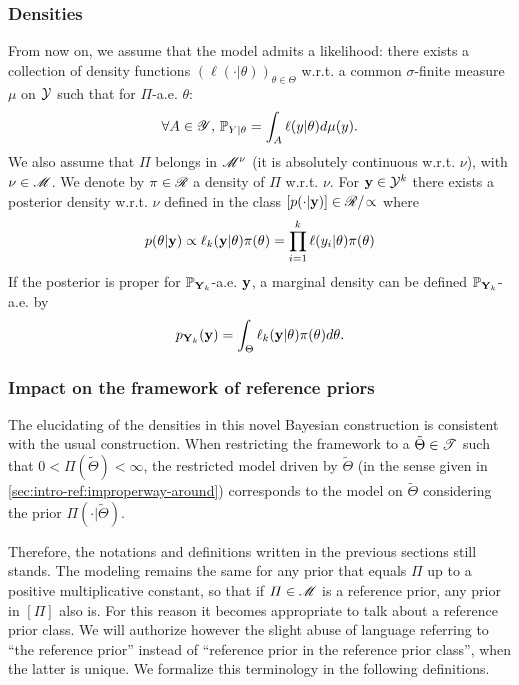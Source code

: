 \subsubsection{Densities}

From now on, we assume that the model admits a likelihood: there exists a collection of density functions $(\ell(\cdot|\theta))_{\theta\in\Theta}$  w.r.t. a common  $\sigma$-finite measure $\mu$ on $\mathcal{Y}$ such that for $\varPi$-a.e. $\theta$:
\begin{equation}
    \forall A\in\mathscr{Y},\,\mathbb{P}_{Y|\theta} = \int_A\ell(y|\theta)d\mu(y).
\end{equation}
We also assume that $\varPi$ belongs in $\mathscr{M}^\nu$ (it is absolutely continuous w.r.t. $\nu$), with $\nu\in\mathscr{M}$. We denote by $\pi\in\mathscr{R}$ a density of $\varPi$ w.r.t. $\nu$.
For $\mathbf{y}\in\mathcal{Y}^k$ there exists a posterior density w.r.t. $\nu$ defined in  the class $[p(\cdot|\mathbf{y})]\in\mathscr{R}/\!\propto$ where
    \begin{equation}
        p(\theta|\mathbf{y}) 
        \propto  \ell_k(\mathbf{y}|\theta)\pi(\theta) = \prod_{i=1}^k\ell(y_i|\theta)\pi(\theta)
    \end{equation}
If the posterior is proper for $\mathbb{P}_{\mathbf{Y}_k}$-a.e. $\mathbf{y}$, a marginal density can be defined $\mathbb{P}_{\mathbf{Y}_k}$-a.e. by
    \begin{equation}
        p_{\mathbf{Y}_k}(\mathbf{y}) =  \int_\Theta\ell_k(\mathbf{y}|\theta)\pi(\theta)d\theta.
    \end{equation}


\subsubsection{Impact on the framework of reference priors}

The elucidating of the densities in this novel Bayesian construction is consistent with the usual construction.
When restricting the framework to a $\tilde\Theta\in\mathscr{T}$ such that $0<\varPi(\tilde\Theta)<\infty$, the restricted model driven by $\tilde\Theta$ (in the sense given in \cref{sec:intro-ref:improperway-around})  corresponds to the model on $\tilde\Theta$ considering the prior $\varPi(\cdot|\tilde\Theta)$.

Therefore, the notations and definitions written in the previous sections still stands.
The modeling remains the same for any prior that equals  $\varPi$ up to a positive multiplicative constant, so that if $\varPi\in\mathscr{M}$ is a reference prior, any prior in $[\varPi]$ also is.
For this reason it becomes appropriate to talk about a reference prior class. 
We will authorize however the slight abuse of language referring to ``the reference prior'' instead of ``reference prior in the reference prior class'', when the latter is unique.
We formalize this terminology in the following definitions.


